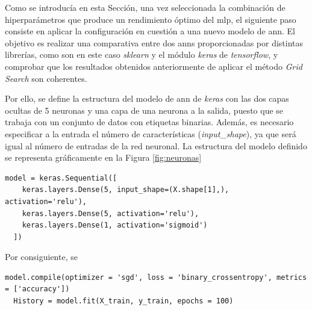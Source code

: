 \vspace{3mm}

Como se introducía en esta Sección, una vez seleccionada la combinación de hiperparámetros que produce un rendimiento óptimo del \gls{mlp}, el siguiente paso consiste en aplicar la configuración en cuestión a una nuevo modelo de \gls{ann}. El objetivo es realizar una comparativa entre dos \gls{ann}s proporcionadas por distintas librerías, como son en este caso \textit{sklearn} y el módulo \textit{keras} de \textit{tensorflow}, y comprobar que los resultados obtenidos anteriormente de aplicar el método \textit{Grid Search} son coherentes. 

\vspace{3mm}

Por ello, se define la estructura del modelo de \gls{ann} de \textit{keras} con las dos capas ocultas de 5 neuronas y una capa de una neurona a la salida, puesto que se trabaja con un conjunto de datos con etiquetas binarias. Además, es necesario especificar a la entrada el número de características (\textit{input\_shape}), ya que será igual al número de entradas de la red neuronal. La estructura del modelo definido se representa gráficamente en la Figura \ref{fig:neuronas}

\vspace{3mm}



\begin{lstlisting}[style=Python, caption={Definición del modelo de ANN de Keras}]
  model = keras.Sequential([
    keras.layers.Dense(5, input_shape=(X.shape[1],), activation='relu'), 
    keras.layers.Dense(5, activation='relu'),
    keras.layers.Dense(1, activation='sigmoid') 
  ]) 
\end{lstlisting}

\vspace{3mm}



Por consiguiente, se 

\begin{lstlisting}[style=Python, caption={Entrenamiento del modelo de ANN de Keras}]
  model.compile(optimizer = 'sgd', loss = 'binary_crossentropy', metrics = ['accuracy'])
  History = model.fit(X_train, y_train, epochs = 100)
\end{lstlisting}






